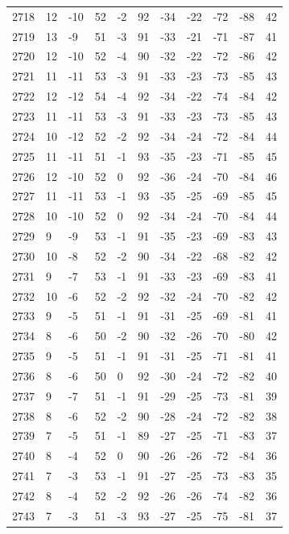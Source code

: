 \begin{table}[H]
\begin{tabular}{lllllllllll}
2718 & 12 & -10 & 52 & -2 & 92 & -34 & -22 & -72 & -88 & 42 \\
2719 & 13 & -9 & 51 & -3 & 91 & -33 & -21 & -71 & -87 & 41 \\
2720 & 12 & -10 & 52 & -4 & 90 & -32 & -22 & -72 & -86 & 42 \\
2721 & 11 & -11 & 53 & -3 & 91 & -33 & -23 & -73 & -85 & 43 \\
2722 & 12 & -12 & 54 & -4 & 92 & -34 & -22 & -74 & -84 & 42 \\
2723 & 11 & -11 & 53 & -3 & 91 & -33 & -23 & -73 & -85 & 43 \\
2724 & 10 & -12 & 52 & -2 & 92 & -34 & -24 & -72 & -84 & 44 \\
2725 & 11 & -11 & 51 & -1 & 93 & -35 & -23 & -71 & -85 & 45 \\
2726 & 12 & -10 & 52 & 0 & 92 & -36 & -24 & -70 & -84 & 46 \\
2727 & 11 & -11 & 53 & -1 & 93 & -35 & -25 & -69 & -85 & 45 \\
2728 & 10 & -10 & 52 & 0 & 92 & -34 & -24 & -70 & -84 & 44 \\
2729 & 9 & -9 & 53 & -1 & 91 & -35 & -23 & -69 & -83 & 43 \\
2730 & 10 & -8 & 52 & -2 & 90 & -34 & -22 & -68 & -82 & 42 \\
2731 & 9 & -7 & 53 & -1 & 91 & -33 & -23 & -69 & -83 & 41 \\
2732 & 10 & -6 & 52 & -2 & 92 & -32 & -24 & -70 & -82 & 42 \\
2733 & 9 & -5 & 51 & -1 & 91 & -31 & -25 & -69 & -81 & 41 \\
2734 & 8 & -6 & 50 & -2 & 90 & -32 & -26 & -70 & -80 & 42 \\
2735 & 9 & -5 & 51 & -1 & 91 & -31 & -25 & -71 & -81 & 41 \\
2736 & 8 & -6 & 50 & 0 & 92 & -30 & -24 & -72 & -82 & 40 \\
2737 & 9 & -7 & 51 & -1 & 91 & -29 & -25 & -73 & -81 & 39 \\
2738 & 8 & -6 & 52 & -2 & 90 & -28 & -24 & -72 & -82 & 38 \\
2739 & 7 & -5 & 51 & -1 & 89 & -27 & -25 & -71 & -83 & 37 \\
2740 & 8 & -4 & 52 & 0 & 90 & -26 & -26 & -72 & -84 & 36 \\
2741 & 7 & -3 & 53 & -1 & 91 & -27 & -25 & -73 & -83 & 35 \\
2742 & 8 & -4 & 52 & -2 & 92 & -26 & -26 & -74 & -82 & 36 \\
2743 & 7 & -3 & 51 & -3 & 93 & -27 & -25 & -75 & -81 & 37 \\

\end{tabular}
\end{table}
